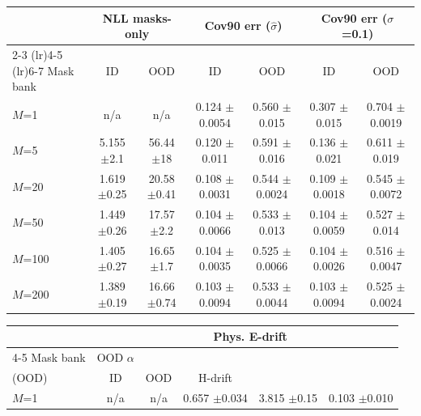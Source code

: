 \begin{table}[t]
\begin{tabular}{lccccccc}
\bottomrule
\end{tabular}%
\par\medskip
\begin{tabular}{lcccccc}
\toprule
 & \multicolumn{2}{c}{NLL masks-only} & \multicolumn{2}{c}{Cov90 err ($\hat\sigma$)} & \multicolumn{2}{c}{Cov90 err ($\sigma$=0.1)} \\
\cmidrule(lr){2-3}
\cmidrule(lr){4-5}
\cmidrule(lr){6-7}
Mask bank & ID & OOD & ID & OOD & ID & OOD \\
\midrule
$M$=1 & n/a & n/a & 0.124 {\footnotesize $\pm$0.0054} & 0.560 {\footnotesize $\pm$0.015} & 0.307 {\footnotesize $\pm$0.015} & 0.704 {\footnotesize $\pm$0.0019} \\
$M$=5 & 5.155 {\footnotesize $\pm$2.1} & 56.44 {\footnotesize $\pm$18} & 0.120 {\footnotesize $\pm$0.011} & 0.591 {\footnotesize $\pm$0.016} & 0.136 {\footnotesize $\pm$0.021} & 0.611 {\footnotesize $\pm$0.019} \\
$M$=20 & 1.619 {\footnotesize $\pm$0.25} & 20.58 {\footnotesize $\pm$0.41} & 0.108 {\footnotesize $\pm$0.0031} & 0.544 {\footnotesize $\pm$0.0024} & 0.109 {\footnotesize $\pm$0.0018} & 0.545 {\footnotesize $\pm$0.0072} \\
$M$=50 & 1.449 {\footnotesize $\pm$0.26} & 17.57 {\footnotesize $\pm$2.2} & 0.104 {\footnotesize $\pm$0.0066} & 0.533 {\footnotesize $\pm$0.013} & 0.104 {\footnotesize $\pm$0.0059} & 0.527 {\footnotesize $\pm$0.014} \\
$M$=100 & 1.405 {\footnotesize $\pm$0.27} & 16.65 {\footnotesize $\pm$1.7} & 0.104 {\footnotesize $\pm$0.0035} & 0.525 {\footnotesize $\pm$0.0066} & 0.104 {\footnotesize $\pm$0.0026} & 0.516 {\footnotesize $\pm$0.0047} \\
$M$=200 & 1.389 {\footnotesize $\pm$0.19} & 16.66 {\footnotesize $\pm$0.74} & 0.103 {\footnotesize $\pm$0.0094} & 0.533 {\footnotesize $\pm$0.0044} & 0.103 {\footnotesize $\pm$0.0094} & 0.525 {\footnotesize $\pm$0.0024} \\
\bottomrule
\end{tabular}%
\par\medskip
\begin{tabular}{lccccc}
\toprule
 &  &  & \multicolumn{2}{c}{Phys. E-drift} &  \\
\cmidrule(lr){4-5}
Mask bank & OOD $\alpha$ & \makecell{Var$_\mathrm{epi}$/Var$_\mathrm{alea}$\\ (OOD)} & ID & OOD & H-drift \\
\midrule
$M$=1 & n/a & n/a & 0.657 {\footnotesize $\pm$0.034} & 3.815 {\footnotesize $\pm$0.15} & 0.103 {\footnotesize $\pm$0.010} \\

\end{tabular}
\end{table}
